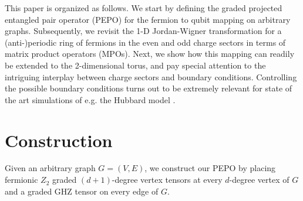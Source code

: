 \documentclass[aps,prx,twocolumn,floatfix,10pt,amssymb,amsfont,amsmath,superscriptaddress,float,nofootinbib,longbibliography,nobalancelastpage]{revtex4-2}
\begin{document}
This paper is organized as follows. We start by defining the graded projected entangled  pair operator (PEPO) for the fermion to qubit mapping on arbitrary graphs. Subsequently, we revisit the 1-D Jordan-Wigner transformation for a (anti-)periodic ring of fermions in the even and odd charge sectors in terms of matrix product operators (MPOs). Next, we show how this mapping can readily be extended to the 2-dimensional torus, and pay special attention to the intriguing interplay between charge sectors and boundary conditions. Controlling the possible boundary conditions turns out to be extremely relevant for state of the art simulations of e.g. the Hubbard model \cite{xu2023coexistence}.

\section{Construction}
Given an arbitrary graph $G = (V,E)$, we construct our PEPO by placing  fermionic $Z_2$ graded  $(d+1)$-degree vertex tensors  \cite{Bultinck_2017} at every $d$-degree vertex of $G$ and a graded GHZ tensor on every edge of $G$.
\end{document}
